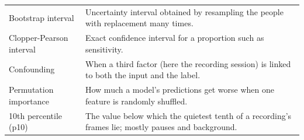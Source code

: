 \documentclass[11pt,a4paper]{article}
\begin{document}
\begin{center}
\begin{longtable}{>{\raggedright\arraybackslash}p{3.57cm}>{\raggedright\arraybackslash}p{12.09cm}}
\hspace{0pt}Bootstrap interval & \hspace{0pt}Uncertainty interval obtained by resampling the people with replacement many times.\\
\hspace{0pt}Clopper-Pearson interval & \hspace{0pt}Exact confidence interval for a proportion such as sensitivity.\\
\hspace{0pt}Confounding & \hspace{0pt}When a third factor (here the recording session) is linked to both the input and the label.\\
\hspace{0pt}Permutation importance & \hspace{0pt}How much a model's predictions get worse when one feature is randomly shuffled.\\
\hspace{0pt}10th percentile (p10) & \hspace{0pt}The value below which the quietest tenth of a recording's frames lie; mostly pauses and background.\\
\end{longtable}\end{center}
\end{document}
